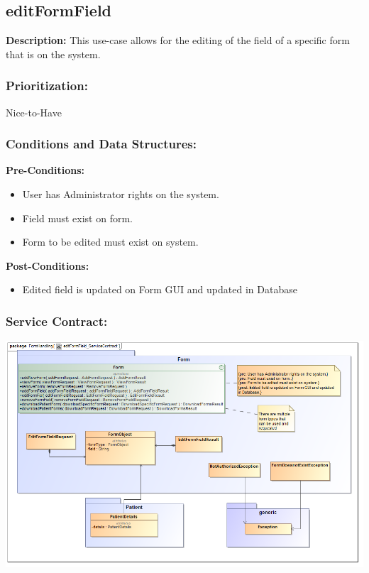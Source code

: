\subsection{editFormField}
\textbf{Description:}
This use-case allows for the editing of the field of a specific form that is on the system.
\subsubsection{Prioritization:}
Nice-to-Have
\subsubsection{Conditions and Data Structures:}
\textbf{Pre-Conditions:}
\begin{itemize}
	\item User has Administrator rights on the system.
	\item Field must exist on form.
	\item Form to be edited must exist on system.
\end{itemize}

\textbf{Post-Conditions:}	
\begin{itemize}
	\item Edited field is updated on Form GUI and updated in Database
\end{itemize}
\subsubsection{Service Contract:} 
\includegraphics[width=1\linewidth]{./Graphics/FormUseCaseDiagrams/editFormField_ServiceContract}
